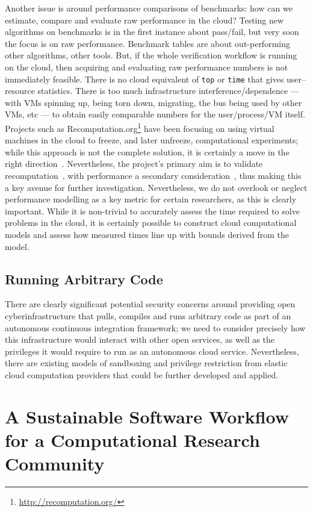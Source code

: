 \documentclass[conference]{IEEEtran}
\begin{document}
Another issue is around performance comparisons of benchmarks: how can
we estimate, compare and evaluate raw performance in the cloud?
Testing new algorithms on benchmarks is in the first instance about
pass/fail, but very soon the focus is on raw performance. Benchmark
tables are about out-performing other algorithms, other tools. But, if
the whole verification workflow is running on the cloud, then
acquiring and evaluating raw performance numbers is not immediately
feasible. There is no cloud equivalent of {\texttt{top}} or
{\texttt{time}} that gives user--resource statistics. There is too
much infrastructure interference/dependence --- with VMs spinning up,
being torn down, migrating, the bus being used by other VMs, etc ---
to obtain easily comparable numbers for the user/process/VM
itself. Projects such as
Recomputation.org\footnote{\url{http://recomputation.org/}} have been
focusing on using virtual machines in the cloud to freeze, and later
unfreeze, computational experiments; while this approach is not the
complete solution, it is certainly a move in the right
direction~\cite{arabas-et-al:2014}. Nevertheless, the project's
primary aim is to validate recomputation~\cite{gent:2013}, with
performance a secondary consideration~\cite{gent+kotthoff:2014}, thus
making this a key avenue for further investigation. Nevertheless, we
do not overlook or neglect performance modelling as a key metric for
certain researchers, as this is clearly important. While it is
non-trivial to accurately assess the time required to solve problems
in the cloud, it is certainly possible to construct cloud
computational models and assess how measured times line up with bounds
derived from the model.


\subsection{Running Arbitrary Code}

There are clearly significant potential security concerns around
providing open cyberinfrastructure that pulls, compiles and runs
arbitrary code as part of an autonomous continuous integration
framework; we need to consider precisely how this infrastructure would
interact with other open services, as well as the privileges it would
require to run as an autonomous cloud service. Nevertheless, there are
existing models of sandboxing and privilege restriction from elastic
cloud computation providers that could be further developed and
applied.


\section{A Sustainable Software Workflow for a Computational Research Community}
\label{rollout}
\end{document}

